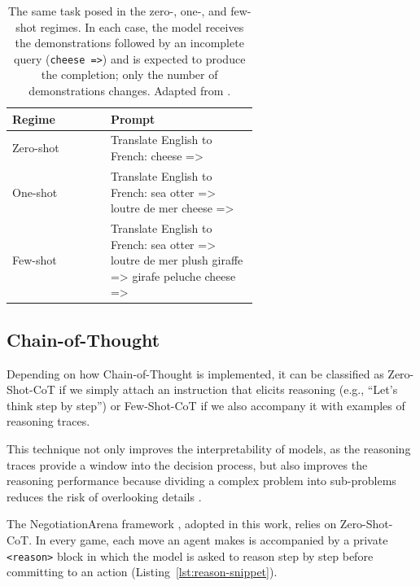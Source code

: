 \begin{table}
\centering
\small
\caption{The same task posed in the zero-, one-, and few-shot regimes. In each case, the model receives the demonstrations followed by an incomplete query (\texttt{cheese =>}) and is expected to produce the completion; only the number of demonstrations changes. Adapted from \textcite{NEURIPS2020_1457c0d6}.}
\label{tab:few-shot}
\begin{tabular}{@{}lp{0.6\linewidth}@{}}
\toprule
\textbf{Regime} & \textbf{Prompt} \\
\midrule
Zero-shot & \ttfamily Translate English to French: \newline cheese => \\
\midrule
One-shot & \ttfamily Translate English to French: \newline sea otter => loutre de mer \newline cheese => \\
\midrule
Few-shot & \ttfamily Translate English to French: \newline sea otter => loutre de mer \newline plush giraffe => girafe peluche \newline cheese => \\
\bottomrule
\end{tabular}
\end{table}

\subsection{Chain-of-Thought} \label{sec:cot}

Depending on how Chain-of-Thought is implemented, it can be classified as Zero-Shot-CoT \parencite{kojima2023largelanguagemodelszeroshot} if we simply attach an instruction that elicits reasoning (e.g., ``Let's think step by step'') or Few-Shot-CoT \parencite{wei_chain--thought_2023} if we also accompany it with examples of reasoning traces. 

This technique not only improves the interpretability of models, as the reasoning traces provide a window into the decision process, but also improves the reasoning performance because dividing a complex problem into sub-problems reduces the risk of overlooking details \parencite{zhang2023ignitinglanguageintelligencehitchhikers}.

The NegotiationArena framework \parencite{bianchi_how_2024}, adopted in this work, relies on Zero-Shot-CoT. In every game, each move an agent makes is accompanied by a private \texttt{<reason>} block in which the model is asked to reason step by step before committing to an action (Listing~\ref{lst:reason-snippet}).

